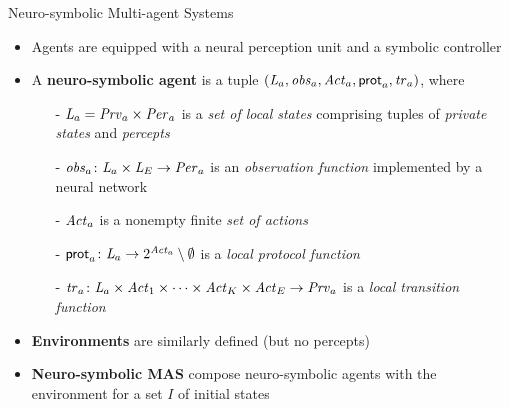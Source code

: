 \documentclass[10pt]{beamer}
\newcommand\blfootnote[1]{%
  \begingroup
  \renewcommand\thefootnote{}\footnote{#1}%
  \addtocounter{footnote}{-1}%
  \endgroup
}
\begin{document}
\begin{frame}{Neuro-symbolic Multi-agent Systems}

\begin{itemize} \itemsep 1em
    \item Agents are equipped with a neural perception unit and a symbolic
        controller
    \item {\bf } A {\bf neuro-symbolic agent} is a tuple $\left ( \mathit{L}_a,
        \mathit{obs}_a, \mathit{Act}_a, \mathsf{prot}_a, \mathit{tr}_a \right )$, where

        \begin{itemize}\itemsep 0cm
            \item[\textcolor{black}{-}] $\mathit{L}_a = \mathit{Prv}_a\times\mathit{Per}_a$ is a
                \emph{set of local states} comprising tuples of {\em private
                states} and {\em percepts}
            \item[\textcolor{black}{-}]
                $\mathit{obs}_a\colon\mathit{L}_a\times\mathit{L}_E\rightarrow\mathit{Per}_a$ is an
                \emph{observation function} implemented by a neural network
            \item[\textcolor{black}{-}] $\mathit{Act}_a$ is a nonempty finite \emph{set
                of actions}
            \item[\textcolor{black}{-}] $\mathsf{prot}_a\colon\mathit{L}_a\rightarrow
                2^{\mathit{Act}_a}\setminus \emptyset$ is a {\em local protocol
                function}
            \item[\textcolor{black}{-}]
                $\mathit{tr}_a\colon\mathit{L}_a\times\mathit{Act}_1\times\dots\times\mathit{Act}_K\times\mathit{Act}_E\rightarrow\mathit{Prv}_a$
                is a {\em local transition function}
        \end{itemize}

    \item {\bf Environments} are similarly defined (but no percepts)
    
    \item {\bf Neuro-symbolic MAS} compose neuro-symbolic agents with the environment for a set $I$ of initial states
\end{itemize}

\end{frame}

\end{document}
